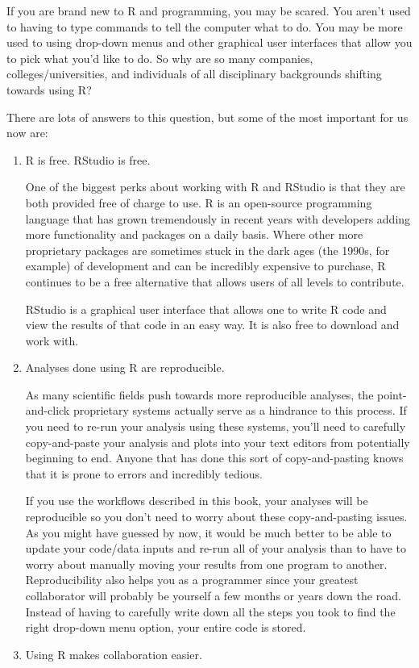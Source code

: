 \documentclass[]{tufte-book}
\theoremstyle{definition}
\theoremstyle{definition}
\theoremstyle{remark}
\begin{document}
If you are brand new to R and programming, you may be scared. You aren't
used to having to type commands to tell the computer what to do. You may
be more used to using drop-down menus and other graphical user
interfaces that allow you to pick what you'd like to do. So why are so
many companies, colleges/universities, and individuals of all
disciplinary backgrounds shifting towards using R?

There are lots of answers to this question, but some of the most
important for us now are:

\begin{enumerate}
\def\labelenumi{\arabic{enumi}.}
\item
  R is free. RStudio is free.

  One of the biggest perks about working with R and RStudio is that they
  are both provided free of charge to use. R is an open-source
  programming language that has grown tremendously in recent years with
  developers adding more functionality and packages on a daily basis.
  Where other more proprietary packages are sometimes stuck in the dark
  ages (the 1990s, for example) of development and can be incredibly
  expensive to purchase, R continues to be a free alternative that
  allows users of all levels to contribute.

  RStudio is a graphical user interface that allows one to write R code
  and view the results of that code in an easy way. It is also free to
  download and work with.
\item
  Analyses done using R are reproducible.

  As many scientific fields push towards more reproducible analyses, the
  point-and-click proprietary systems actually serve as a hindrance to
  this process. If you need to re-run your analysis using these systems,
  you'll need to carefully copy-and-paste your analysis and plots into
  your text editors from potentially beginning to end. Anyone that has
  done this sort of copy-and-pasting knows that it is prone to errors
  and incredibly tedious.

  If you use the workflows described in this book, your analyses will be
  reproducible so you don't need to worry about these copy-and-pasting
  issues. As you might have guessed by now, it would be much better to
  be able to update your code/data inputs and re-run all of your
  analysis than to have to worry about manually moving your results from
  one program to another. Reproducibility also helps you as a programmer
  since your greatest collaborator will probably be yourself a few
  months or years down the road. Instead of having to carefully write
  down all the steps you took to find the right drop-down menu option,
  your entire code is stored.
\item
  Using R makes collaboration easier.


\end{enumerate}
\end{document}
